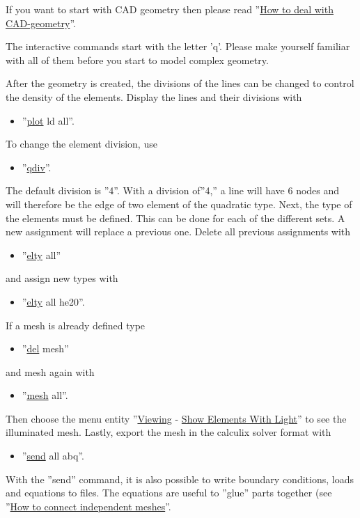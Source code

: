 \documentclass{article}
\providecommand{\htmlref}[2]{\hyperref[#2]{#1}}
\begin{document}
If you want to start with CAD geometry then please read ''\htmlref{How to deal with CAD-geometry}{How to deal with CAD-geometry}''.

The interactive commands start with the letter 'q'. Please make yourself familiar with all of them before you start to model complex geometry.

After the geometry is created, the divisions of the lines can be changed to control the density of the elements.  Display the lines and their divisions with 
\begin{itemize}
\item ''\htmlref{plot}{plot} ld all''.
\end{itemize}
To change the element division, use 
\begin{itemize}
\item ''\htmlref{qdiv}{qdiv}''.
\end{itemize}
The default division is ''4''. With a division of''4,'' a line will have 6 nodes and will therefore be the edge of two element of the quadratic type. Next, the type of the elements must be defined. This can be done for each of the different sets. A new assignment will replace a previous one. Delete all previous assignments with
\begin{itemize}
\item ''\htmlref{elty}{elty} all''
\end{itemize}
and assign new types with
\begin{itemize}
\item ''\htmlref{elty}{elty} all he20''.
\end{itemize}
If a mesh is already defined type
\begin{itemize}
\item ''\htmlref{del}{del} mesh''
\end{itemize}
and mesh again with
\begin{itemize}
\item ''\htmlref{mesh}{mesh} all''.
\end{itemize}
Then choose the menu entity ''\htmlref{Viewing}{Viewing} - \htmlref{Show Elements With Light}{Show Elements With Light}'' to see the illuminated mesh. Lastly, export the mesh in the calculix solver format with
\begin{itemize}
\item ''\htmlref{send}{send} all abq''.
\end{itemize}
With the ''send'' command, it is also possible to write boundary conditions, loads and equations to files. The equations are useful to ''glue'' parts together (see ''\htmlref{How to connect independent meshes}{How to connect independent meshes}''.
\end{document}
